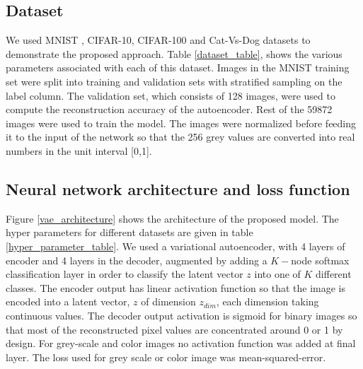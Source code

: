 \documentclass{uai2021} %
\begin{document}
\subsection{Dataset}
We used MNIST \cite{lecun-mnisthandwrittendigit-2010}, CIFAR-10\cite{cifar10}, CIFAR-100\cite{CIFAR-100} and Cat-Vs-Dog datasets  to demonstrate the proposed approach. Table \ref{dataset_table}, shows the various parameters associated with each of this dataset.
Images in the MNIST training set were split into training and validation sets with stratified sampling on the label column.
The validation set, which consists of 128 images, were used to compute the reconstruction accuracy of the autoencoder.
Rest of the 59872 images were used to train the model. The images were normalized  before feeding it to the input of the network so that the 256 grey values are converted into real numbers in the unit interval [0,1].

\subsection{Neural network architecture and loss function}
Figure \ref{vae_architecture} shows the architecture of the proposed model.
The hyper parameters for different datasets are given in table \ref{hyper_parameter_table}.
We used a variational autoencoder\cite{kingma2013auto}, with 4 layers of encoder and 4 layers in the decoder, augmented by adding a $K-$node softmax classification layer in order to classify the latent vector $z$ into one of $K$ different classes.
The encoder output has linear activation function so that the image is encoded into a latent vector, $z$  of dimension $z_{dim}$, each dimension taking continuous values.
The decoder output activation is sigmoid for binary images so that most of the reconstructed pixel values  are concentrated around 0 or 1 by design.
For grey-scale and color images no activation function was added at final layer. The loss used for grey scale or color image was mean-squared-error.
\end{document}
